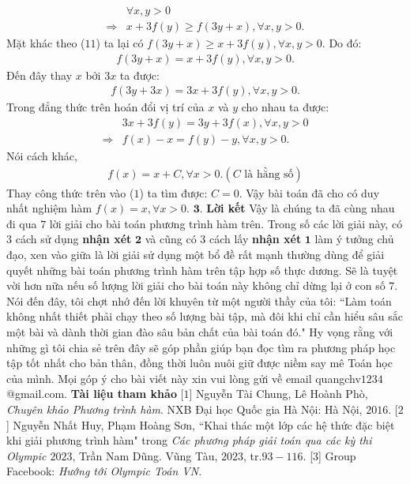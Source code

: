 \begin{multicols}{2}
\begin{align*}
		&\forall x,y > 0\\
		\Rightarrow &x + 3f(y) \ge f(3y + x),\forall x,y > 0.
	\end{align*}
	Mặt khác theo ($11$) ta lại có $f(3y + x) \ge x + 3f(y),\forall x,y > 0.$  Do đó: 
	\begin{align*}
		f(3y + x) = x + 3f(y),\forall x,y > 0. 
	\end{align*}
	Đến đây thay $x$  bởi $3x$  ta được: 
	\begin{align*}
		f(3y + 3x) = 3x + 3f(y),\forall x,y > 0.
	\end{align*}
	Trong đẳng thức trên hoán đổi vị trí của $x$  và $y$ cho nhau ta được: 
	\begin{align*}
		&3x + 3f(y) = 3y + 3f(x),\forall x,y > 0\\
		\Rightarrow &f(x) - x = f(y) - y,\forall x,y > 0.
	\end{align*}
	Nói cách khác, 
	\begin{align*}
		f(x) = x + C,\forall x > 0. (C \text{ là hằng số})
	\end{align*}
	Thay công thức trên vào ($1$) ta tìm được: $C = 0$.
	\vskip 0.05cm  
	Vậy bài toán đã cho có duy nhất nghiệm hàm  $f(x) = x,\forall x > 0.$
	\vskip 0.1cm
	$\pmb{3.}$	\textbf{\color{hoccungpi}Lời kết}
	\vskip 0.1cm
	Vậy là chúng ta đã cùng nhau đi qua $7$ lời giải cho bài toán phương trình hàm trên. Trong số các lời giải này, có $3$ cách sử dụng \textbf{\color{hoccungpi}nhận xét} $\pmb2$ và cũng có $3$ cách lấy \textbf{\color{hoccungpi}nhận xét} $\pmb1$ làm ý tưởng chủ đạo, xen vào giữa là lời giải sử dụng một bổ đề rất mạnh thường dùng để giải quyết những bài toán phương trình hàm trên tập hợp số thực dương. Sẽ là tuyệt vời hơn nữa nếu số lượng lời giải cho bài toán này không chỉ dừng lại ở con số $7$.  Nói đến đây, tôi chợt nhớ đến lời khuyên từ một người thầy của tôi: ``Làm toán không nhất thiết phải chạy theo số lượng bài tập, mà đôi khi chỉ cần hiểu sâu sắc một bài và dành thời gian đào sâu bản chất của bài toán đó." Hy vọng rằng với những gì tôi chia sẻ trên đây sẽ góp phần giúp bạn đọc tìm ra phương pháp học tập tốt nhất cho bản thân, đồng thời luôn nuôi giữ được niềm say mê Toán học của mình. 
	Mọi góp ý cho bài viết này xin vui lòng gửi về email quangchv$1234$@gmail.com.
	\vskip 0.1cm
	\textbf{\color{hoccungpi}Tài liệu tham khảo}
	\vskip 0.1cm
	[$1$] Nguyễn Tài Chung, Lê Hoành Phò, \textit{Chuyên khảo Phương trình hàm}. NXB Đại học Quốc gia Hà Nội: Hà Nội, $2016$.
	\vskip 0.1cm
	[$2$] Nguyễn Nhất Huy, Phạm Hoàng Sơn, ``Khai thác một lớp các hệ thức đặc biệt khi giải phương trình hàm" trong \textit{Các phương pháp giải toán qua các kỳ thi Olympic $2023$}, Trần Nam Dũng. Vũng Tàu, $2023$, tr.$93-116$.
	\vskip 0.1cm  
	[$3$] Group Facebook: \textit{Hướng tới Olympic Toán VN}.
\end{multicols}